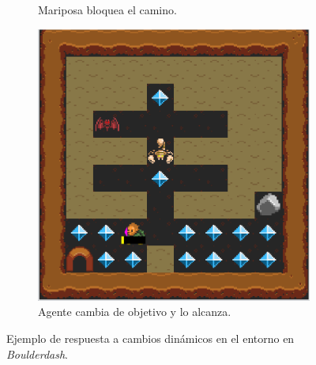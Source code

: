 \begin{figure}[H]
\begin{subfigure}[t]{0.32\textwidth}
        \caption{Mariposa bloquea el camino.}
        \label{fig:discrepancy_2}
    \end{subfigure}%
    \begin{subfigure}[t]{0.32\textwidth}
        \centering
        \includegraphics[scale=0.2]{img/CH08/discrepancy_3.png}
        \caption{Agente cambia de objetivo y lo alcanza.}
        \label{fig:discrepancy_3}
    \end{subfigure}
    \caption{Ejemplo de respuesta a cambios dinámicos en el entorno en \textit{Boulderdash}.}
    \label{fig:discrepancies}
\end{figure}